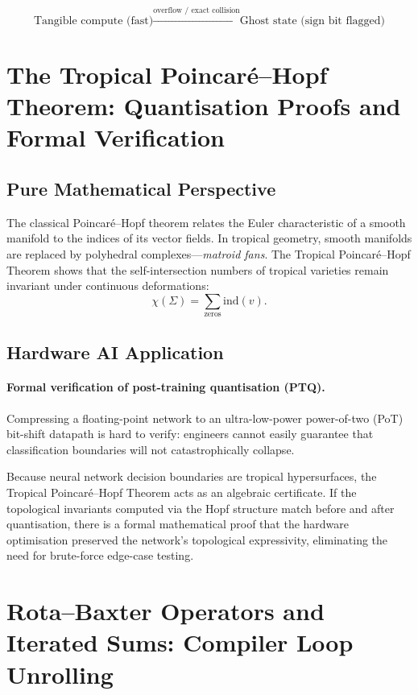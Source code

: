 \documentclass[11pt]{article}
\begin{document}
\[
\text{Tangible compute (fast)} \xrightarrow{\text{overflow / exact collision}} \text{Ghost state (sign bit flagged)}
\]

\section{The Tropical Poincar\'{e}--Hopf Theorem: Quantisation Proofs and Formal Verification}

\subsection{Pure Mathematical Perspective}

The classical Poincar\'{e}--Hopf theorem relates the Euler characteristic of a smooth manifold to the indices of its vector fields. In tropical geometry, smooth manifolds are replaced by polyhedral complexes---\emph{matroid fans}. The Tropical Poincar\'{e}--Hopf Theorem shows that the self-intersection numbers of tropical varieties remain invariant under continuous deformations:
\begin{equation}
\chi(\Sigma) = \sum_{\text{zeros}} \mathrm{ind}(v).
\end{equation}

\subsection{Hardware AI Application}

\paragraph{Formal verification of post-training quantisation (PTQ).}
Compressing a floating-point network to an ultra-low-power power-of-two (PoT) bit-shift datapath is hard to verify: engineers cannot easily guarantee that classification boundaries will not catastrophically collapse.

Because neural network decision boundaries are tropical hypersurfaces, the Tropical Poincar\'{e}--Hopf Theorem acts as an algebraic certificate. If the topological invariants computed via the Hopf structure match before and after quantisation, there is a formal mathematical proof that the hardware optimisation preserved the network's topological expressivity, eliminating the need for brute-force edge-case testing.

\section{Rota--Baxter Operators and Iterated Sums: Compiler Loop Unrolling}
\end{document}
